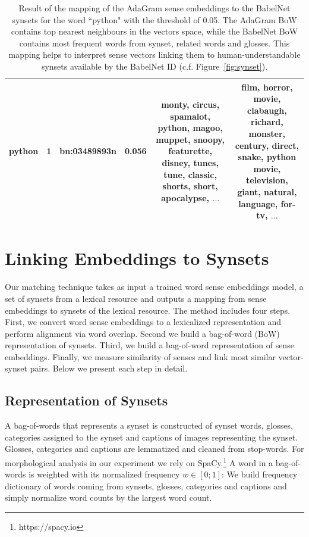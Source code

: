 \documentclass[10pt, a4paper]{article}
\begin{document}
\begin{table}
\begin{center}
\begin{tabular}{cccccc}
python & 1 & bn:03489893n &  0.056  & \parbox{4.6cm}{monty, circus, spamalot, python, magoo, muppet, snoopy, featurette, disney, tunes, tune, classic, shorts, short, apocalypse, $\ldots$} &  \parbox{4.6cm}{film, horror, movie, clabaugh, richard, monster, century, direct, snake, python movie, television, giant, natural, language, for-tv, $\ldots$ }\\ \hline



\end{tabular}
\end{center}
\caption{ Result of the mapping of the AdaGram sense embeddings to the BabelNet synsets for the word ``python" with the threshold of 0.05. The AdaGram BoW contains top nearest neighbours in the vectors space, while the BabelNet BoW contains most frequent words from synset, related words and glosses. This mapping helps to interpret sense vectors linking them to human-understandable synsets available by the BabelNet ID (c.f. Figure~\ref{fig:synset}). }
\label{tbl:example}
\end{table}
 
 
\section{Linking Embeddings to Synsets}
\label{sec:match}

Our matching technique takes as input a trained word sense embeddings model, a set of synsets from a lexical resource and outputs a mapping from sense embeddings to synsets of the lexical resource. The method includes four steps. First, we convert word sense embeddings to a lexicalized representation and perform alignment via word overlap.  Second we build a bag-of-word (BoW) representation of synsets. Third, we build a bag-of-word representation of  sense embeddings. Finally, we measure similarity of senses and link most similar vector-synset pairs. Below we present each step in detail.


\subsection{Representation of Synsets}
\label{sec:representation}

A bag-of-words that represents a synset is constructed of synset words, glosses, categories assigned to the synset and captions of images representing the synset. Glosses, categories and captions are lemmatized and cleaned from stop-words. For morphological analysis in our experiment we rely on SpaCy.\footnote{https://spacy.io} A word in a bag-of-words is weighted with its normalized frequency $w \in [0;1]$: We build frequency dictionary of words coming from synsets, glosses, categories and captions and simply normalize word counts by the largest word count.
\end{document}
